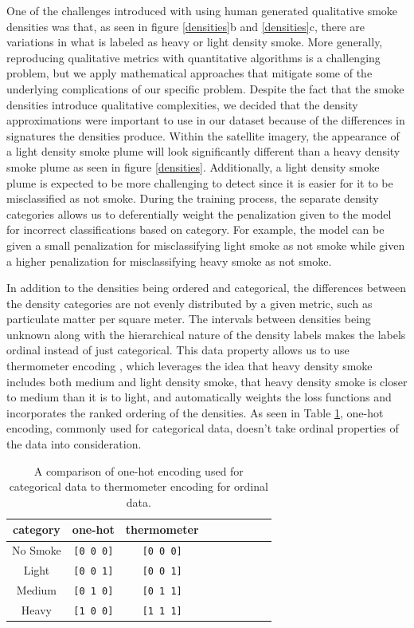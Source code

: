 \documentclass{article}
\begin{document}
One of the challenges introduced with using human generated qualitative smoke densities was that, as seen in figure \ref{densities}b and \ref{densities}c, there are variations in what is labeled as heavy or light density smoke. More generally, reproducing qualitative metrics with quantitative algorithms is a challenging problem, but we apply mathematical approaches that mitigate some of the underlying complications of our specific problem. Despite the fact that the smoke densities introduce qualitative complexities, we decided that the density approximations were important to use in our dataset because of the differences in signatures the densities produce. Within the satellite imagery, the appearance of a light density smoke plume will look significantly different than a heavy density smoke plume as seen in figure \ref{densities}. Additionally, a light density smoke plume is expected to be more challenging to detect since it is easier for it to be misclassified as not smoke. During the training process, the separate density categories allows us to deferentially weight the penalization given to the model for incorrect classifications based on category. For example, the model can be given a small penalization for misclassifying light smoke as not smoke while given a higher penalization for misclassifying heavy smoke as not smoke. 

In addition to the densities being ordered and categorical, the differences between the density categories are not evenly distributed by a given metric, such as particulate matter per square meter. The intervals between densities being unknown along with the hierarchical nature of the density labels makes the labels ordinal instead of just categorical. This data property allows us to use thermometer encoding \cite{therm_enc}, which leverages the idea that heavy density smoke includes both medium and light density smoke, that heavy density smoke is closer to medium than it is to light, and automatically weights the loss functions and incorporates the ranked ordering of the densities. As seen in Table \ref{therm}, one-hot encoding, commonly used for categorical data, doesn't take ordinal properties of the data into consideration.

\begin{table}[h] 
    \caption{A comparison of one-hot encoding used for categorical data to thermometer encoding for ordinal data.}\label{therm}
    \centering
    \begin{tabular}{ccccrrcrc}
        \toprule
        category & one-hot & thermometer \\
        \midrule
        No Smoke & \texttt{[0 0 0]} & \texttt{[0 0 0]} \\
        Light  & \texttt{[0 0 1]} & \texttt{[0 0 1]} \\
        Medium & \texttt{[0 1 0]} & \texttt{[0 1 1]} \\
        Heavy  & \texttt{[1 0 0]} & \texttt{[1 1 1]} \\
        \bottomrule
    \end{tabular}
\end{table}
\end{document}
